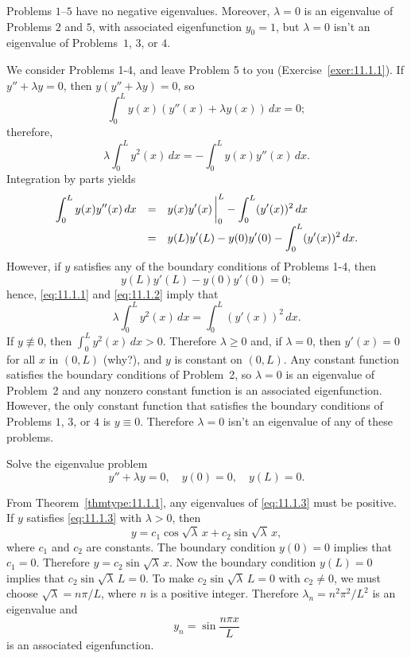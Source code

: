 \begin{theorem}
  \color{blue}
  \label{thmtype:11.1.1} Problems $1$--$5$ have no negative eigenvalues. Moreover, $\lambda=0$ is an
  eigenvalue of Problems $2$ and $5$, with associated eigenfunction $y_{0}=1$, but $\lambda=0$ isn't
  an eigenvalue of Problems~$1$, $3$, or $4$.
\end{theorem}

\proof We consider Problems 1-4, and leave Problem 5 to you (Exercise~\ref{exer:11.1.1}). If
$y''+\lambda y=0$, then $y(y''+\lambda y)=0$, so
\[
  \int_{0}^{L}y(x)(y''(x)+\lambda y(x))\,dx=0;
\]
therefore,
\begin{equation}
  \label{eq:11.1.1}\lambda\int_{0}^{L}y^{2}(x)\,dx=-\int_{0}^{L}y(x)y''(x)\,dx.
\end{equation}
Integration by parts yields
\begin{equation}
  \label{eq:11.1.2}
  \begin{array}{rcl}
    \displaystyle\int_{0}^{L}y(x)y''(x)\,dx & = & \displaystyle y(x)y'(x)\,\bigg|_{0}^{L}-\int_{0}^{L} (y'(x))^{2}\,dx    \\
                                   & = & \displaystyle y(L)y'(L)-y(0)y'(0)-\int_{0}^{L}(y'(x))^{2}\,dx.
  \end{array}
\end{equation}
However, if $y$ satisfies any of the boundary conditions of Problems 1-4, then
\[
  y(L)y'(L)-y(0)y'(0)=0;
\]
hence, \eqref{eq:11.1.1} and \eqref{eq:11.1.2} imply that
\[
  \lambda\int_{0}^{L}y^{2}(x)\,dx=\int_{0}^{L}(y'(x))^{2}\,dx.
\]
If $y\not\equiv0$, then $\int_{0}^{L}y^{2}(x)\,dx>0$. Therefore $\lambda\ge0$ and, if $\lambda=0$,
then $y'(x)=0$ for all $x$ in $(0,L)$ (why?), and $y$ is constant on $(0,L)$. Any constant function
satisfies the boundary conditions of Problem~2, so $\lambda=0$ is an eigenvalue of Problem~2 and any
nonzero constant function is an associated eigenfunction. However, the only constant function that
satisfies the boundary conditions of Problems $1$, $3$, or $4$ is $y\equiv0$. Therefore $\lambda=0$
isn't an eigenvalue of any of these problems.

\begin{example}[Problem 1]
  \label{example:11.1.1} \rm Solve the eigenvalue problem
  \begin{equation}
    \label{eq:11.1.3}y''+\lambda y=0,\quad y(0)=0,\quad y(L)=0.
  \end{equation}

  \solution From Theorem~\ref{thmtype:11.1.1}, any eigenvalues of \eqref{eq:11.1.3} must be
  positive. If $y$ satisfies \eqref{eq:11.1.3} with $\lambda>0$, then
  \[
    y=c_{1}\cos\sqrt{\lambda}\,x+c_{2}\sin\sqrt{\lambda}\,x,
  \]
  where $c_{1}$ and $c_{2}$ are constants. The boundary condition $y(0)=0$ implies that $c_{1}=0$.
  Therefore $y=c_{2}\sin\sqrt{\lambda}\,x$. Now the boundary condition $y(L)=0$ implies that
  $c_{2}\sin\sqrt{\lambda}\,L=0$. To make $c_{2}\sin\sqrt{\lambda}\,L=0$ with $c_{2}\ne0$, we must
  choose $\sqrt{\lambda}=n\pi/L$, where $n$ is a positive integer. Therefore
  $\lambda_{n}=n^{2}\pi^{2}/L^{2}$ is an eigenvalue and
  \[
    y_{n}=\sin\frac{n\pi x}{L}
  \]
  is an associated eigenfunction. \bbox
\end{example}

